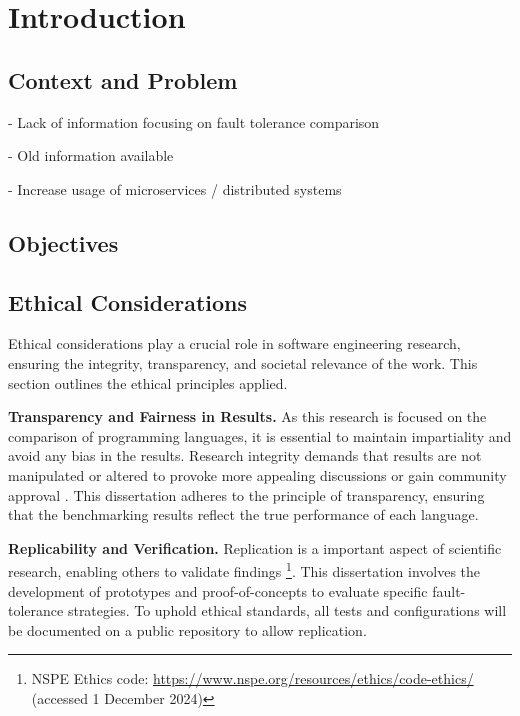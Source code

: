 % 
\chapter{Introduction} %
\label{chap:Chapter1} %


%
\section{Context and Problem} 

- Lack of information focusing on fault tolerance comparison

- Old information available

- Increase usage of microservices / distributed systems 

\section{Objectives}


\section{Ethical Considerations}

Ethical considerations play a crucial role in software engineering research, ensuring the integrity, transparency, and societal relevance of the work. This section outlines the ethical principles applied.

\textbf{Transparency and Fairness in Results.} As this research is focused on the comparison of programming languages, it is essential to maintain impartiality and avoid any bias in the results. Research integrity demands that results are not manipulated or altered to provoke more appealing discussions or gain community approval \cite{EthicDeb2018}. This dissertation adheres to the principle of transparency, ensuring that the benchmarking results reflect the true performance of each language.

\textbf{Replicability and Verification.} Replication is a important aspect of scientific research, enabling others to validate findings \footnote{NSPE Ethics code: \url{https://www.nspe.org/resources/ethics/code-ethics/} (accessed 1 December 2024)}. This dissertation involves the development of prototypes and proof-of-concepts to evaluate specific fault-tolerance strategies. To uphold ethical standards, all tests and configurations will be documented on a public repository to allow replication.

